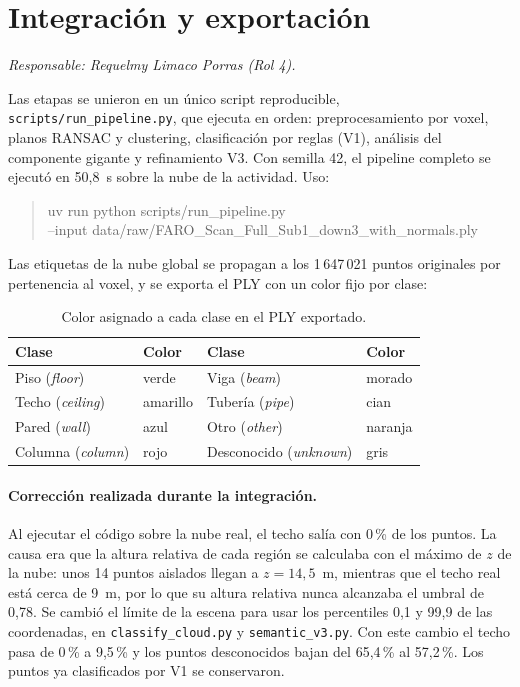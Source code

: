 \documentclass[11pt,a4paper]{article}
\begin{document}
\section{Integración y exportación}
\label{sec:integracion}
\textit{Responsable: Requelmy Limaco Porras (Rol 4).}

Las etapas se unieron en un único script reproducible, \texttt{scripts/run\_pipeline.py}, que ejecuta en orden: preprocesamiento por voxel, planos RANSAC y clustering, clasificación por reglas (V1), análisis del componente gigante y refinamiento V3. Con semilla 42, el pipeline completo se ejecutó en 50,8~s sobre la nube de la actividad. Uso:
\begin{quote}\small\ttfamily\raggedright
uv run python scripts/run\_pipeline.py \\ --input data/raw/FARO\_Scan\_Full\_Sub1\_down3\_with\_normals.ply
\end{quote}
Las etiquetas de la nube global se propagan a los 1\,647\,021 puntos originales por pertenencia al voxel, y se exporta el PLY con un color fijo por clase:

\begin{table}[H]
\centering
\begin{tabular}{llll}
\toprule
Clase & Color & Clase & Color \\
\midrule
Piso (\textit{floor}) & verde & Viga (\textit{beam}) & morado \\
Techo (\textit{ceiling}) & amarillo & Tubería (\textit{pipe}) & cian \\
Pared (\textit{wall}) & azul & Otro (\textit{other}) & naranja \\
Columna (\textit{column}) & rojo & Desconocido (\textit{unknown}) & gris \\
\bottomrule
\end{tabular}
\caption{Color asignado a cada clase en el PLY exportado.}
\end{table}

\paragraph{Corrección realizada durante la integración.} Al ejecutar el código sobre la nube real, el techo salía con 0\,\% de los puntos. La causa era que la altura relativa de cada región se calculaba con el máximo de $z$ de la nube: unos 14 puntos aislados llegan a $z=14{,}5$~m, mientras que el techo real está cerca de 9~m, por lo que su altura relativa nunca alcanzaba el umbral de 0,78. Se cambió el límite de la escena para usar los percentiles 0,1 y 99,9 de las coordenadas, en \texttt{classify\_cloud.py} y \texttt{semantic\_v3.py}. Con este cambio el techo pasa de 0\,\% a 9,5\,\% y los puntos desconocidos bajan del 65,4\,\% al 57,2\,\%. Los puntos ya clasificados por V1 se conservaron.
\end{document}

